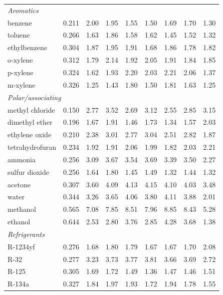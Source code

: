 \begin{table}[H]
\begin{tabular}{lcccccccc}
\multicolumn{9}{l}{\emph{Aromatics}} \\
benzene & 0.211 & 2.00 & 1.95 & 1.55 & 1.50 & 1.69 & 1.70 & 1.30 \\
toluene & 0.266 & 1.63 & 1.86 & 1.58 & 1.62 & 1.45 & 1.52 & 1.32 \\
ethylbenzene & 0.304 & 1.87 & 1.95 & 1.91 & 1.68 & 1.86 & 1.78 & 1.82 \\
o-xylene & 0.312 & 1.79 & 2.14 & 1.92 & 2.05 & 1.91 & 1.84 & 1.85 \\
p-xylene & 0.324 & 1.62 & 1.93 & 2.20 & 2.03 & 2.21 & 2.06 & 1.37 \\
m-xylene & 0.326 & 1.25 & 1.43 & 1.80 & 1.50 & 1.81 & 1.63 & 1.25 \\
\multicolumn{9}{l}{\emph{Polar/associating}} \\
methyl chloride & 0.150 & 2.77 & 3.52 & 2.69 & 3.12 & 2.55 & 2.85 & 3.15 \\
dimethyl ether & 0.196 & 1.67 & 1.91 & 1.46 & 1.73 & 1.34 & 1.57 & 2.03 \\
ethylene oxide & 0.210 & 2.38 & 3.01 & 2.77 & 3.04 & 2.51 & 2.82 & 1.87 \\
tetrahydrofuran & 0.234 & 1.92 & 1.91 & 2.06 & 1.99 & 1.82 & 2.03 & 2.21 \\
ammonia & 0.256 & 3.09 & 3.67 & 3.54 & 3.69 & 3.39 & 3.50 & 2.27 \\
sulfur dioxide & 0.256 & 1.64 & 1.80 & 1.45 & 1.49 & 1.32 & 1.44 & 1.32 \\
acetone & 0.307 & 3.60 & 4.09 & 4.13 & 4.15 & 4.10 & 4.03 & 3.48 \\
water & 0.344 & 3.26 & 3.65 & 4.06 & 3.80 & 4.11 & 3.88 & 2.01 \\
methanol & 0.565 & 7.08 & 7.85 & 8.51 & 7.96 & 8.85 & 8.43 & 5.28 \\
ethanol & 0.644 & 2.53 & 2.80 & 3.76 & 2.85 & 4.28 & 3.68 & 1.38 \\
\multicolumn{9}{l}{\emph{Refrigerants}} \\
R-1234yf & 0.276 & 1.68 & 1.80 & 1.79 & 1.67 & 1.67 & 1.70 & 2.08 \\
R-32 & 0.277 & 3.23 & 3.73 & 3.77 & 3.81 & 3.66 & 3.69 & 2.72 \\
R-125 & 0.305 & 1.69 & 1.72 & 1.49 & 1.36 & 1.47 & 1.46 & 1.51 \\
R-134a & 0.327 & 1.84 & 1.97 & 1.93 & 1.72 & 1.94 & 1.78 & 1.55 \\
\bottomrule
\end{tabular}
\end{table}
